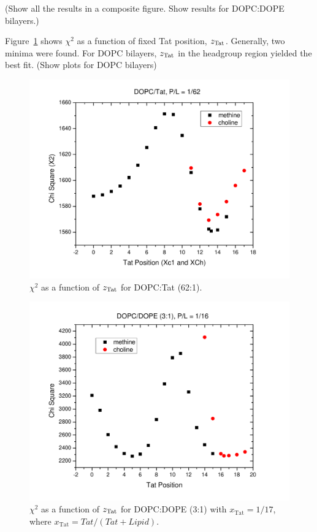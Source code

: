 (Show all the results in a composite figure. Show results for DOPC:DOPE bilayers.)

Figure~\ref{fig:DOPC_Tat_62to1_X2} shows $\chi^2$ as a function of fixed Tat position, 
$z_\textrm{Tat}$. Generally, two minima were found. For DOPC bilayers, $z_\textrm{Tat}$ in the 
headgroup region yielded the best fit. (Show plots for DOPC bilayers)
\begin{figure}[htbp]
  \centering
  \includegraphics[scale=0.3]{./figures/Tat/SDP_Results/DOPC_Tat_62to1_X2.pdf}
  \caption{$\chi^2$ as a function of $z_\textrm{Tat}$ for DOPC:Tat (62:1).}
  \label{fig:DOPC_Tat_62to1_X2}
\end{figure}
\begin{figure}[htbp]
  \centering
  \includegraphics[scale=0.3]{./figures/Tat/SDP_Results/DOPCDOPE3to1_Tat_16to1_X2.pdf}
  \caption{$\chi^2$ as a function of $z_\textrm{Tat}$ for DOPC:DOPE (3:1) with 
  $x_\textrm{Tat}=1/17$, where $x_\textrm{Tat}=Tat/(Tat+Lipid)$.}
  \label{fig:DOPCDOPE3to1_Tat_16to1_X2}
\end{figure}
